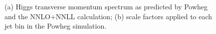 \begin{figure}[!htbp]
\begin{center}
\caption{(a) Higgs transverse momentum spectrum as predicted by Powheg and the NNLO+NNLL calculation; (b) 
scale factors applied to each jet bin in the Powheg simulation.}
\label{fig:h160ww_pthiggs}
\end{center}
\end{figure}
